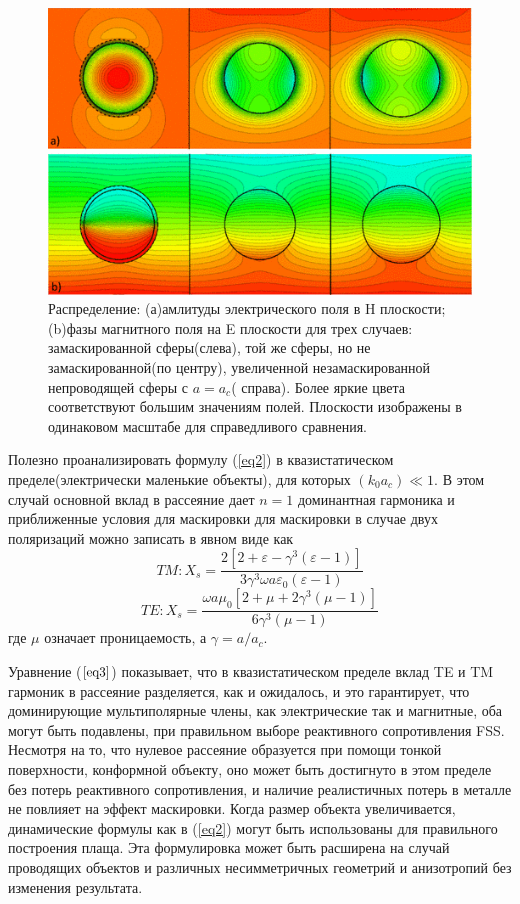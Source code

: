 \documentclass[12pt,a4paper]{article}
\begin{document}
\begin{figure}[t]
  \centering
  \includegraphics[height=0.16\paperheight, width=0.4\paperwidth]{3.png}
  \caption{Распределение: (а)амлитуды электрического поля в H плоскости;(b)фазы магнитного 
  поля на E плоскости для трех случаев: замаскированной сферы(слева), той же сферы, но не 
  замаскированной(по центру), увеличенной незамаскированной непроводящей сферы с $a=a_c$(
  справа). Более яркие цвета соответствуют большим значениям полей. Плоскости изображены в 
  одинаковом масштабе для справедливого сравнения.}
  \label{fig:3}
\end{figure}

Полезно проанализировать формулу (\ref{eq2}) в квазистатическом пределе(электрически 
маленькие объекты), 
для которых $(k_0a_c) \ll 1$. В этом случай основной вклад в рассеяние дает
$n=1$ доминантная гармоника и приближенные условия для маскировки для маскировки в 
случае двух поляризаций можно записать в явном виде как
\begin{equation*}
TM:X_s = 
\frac{2[2+\varepsilon-\gamma^3(\varepsilon-1)]}{3\gamma^3\omega a\varepsilon_0(\varepsilon-1)
}
\end{equation*}
\begin{equation}\label{eq3}
TE:X_s = \frac{\omega a\mu_0[2+\mu+2\gamma^3(\mu-1)]}{6\gamma^3(\mu-1)}
\end{equation}
где $\mu$ означает проницаемость, а $\gamma=a/a_c$.

Уравнение ($\ref{eq3}$) показывает, что в квазистатическом пределе вклад TE и TM гармоник в 
рассеяние разделяется, как и ожидалось, и это гарантирует, что доминирующие мультиполярные
члены, как электрические так и магнитные, оба могут быть подавлены, при правильном выборе
реактивного сопротивления FSS. Несмотря на то, что нулевое рассеяние образуется при помощи 
тонкой поверхности, конформной объекту, оно может быть достигнуто в этом пределе без потерь 
реактивного сопротивления, и наличие реалистичных потерь в металле не повлияет на эффект 
маскировки. Когда размер объекта увеличивается, динамические формулы как в (\ref{eq2}) могут
быть использованы для правильного построения плаща. Эта формулировка может быть расширена на
случай проводящих объектов и различных несимметричных геометрий и анизотропий без изменения
результата.
\end{document}
